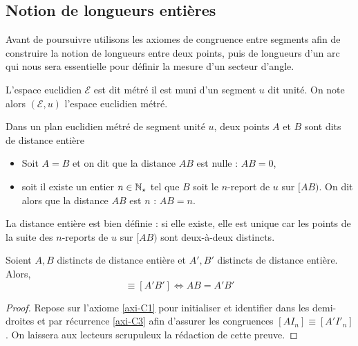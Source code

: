         \subsection{Notion de longueurs entières}

Avant de poursuivre utilisons les axiomes de congruence entre segments afin de construire la notion de longueurs entre deux points, puis de longueurs d'un arc qui nous sera essentielle pour définir la mesure d'un secteur d'angle.

\begin{defi}
    L'espace euclidien $\mathcal{E}$ est dit métré \ssi il est muni d'un segment $u$ dit unité. On note alors $(\mathcal{E},u)$ l'espace euclidien métré. 
\end{defi}
\begin{defi}
    Dans un plan euclidien métré de segment unité $u$, deux points $A$ et $B$ sont dits de distance entière \ssi
    \begin{itemize}[$\bullet$]
        \item Soit $A=B$ et on dit que la distance $AB$ est nulle : $AB=0$,
        \item soit il existe un entier $n\in \mathbb{N}_\star$ tel que $B$ soit le $n$-report de $u$ sur $[AB)$. On dit alors que la distance $AB$ est $n$ : $AB=n$. 
    \end{itemize}
\end{defi}
\begin{rema}
    La distance entière est bien définie : si elle existe, elle est unique car les points de la suite des $n$-reports de $u$ sur $[AB)$ sont deux-à-deux distincts.
\end{rema}
\begin{prop}
    Soient $A,B$ distincts de distance entière et $A',B'$ distincts de distance entière. Alors,
    \begin{equation*}
        [AB]\equiv[A'B'] \Longleftrightarrow AB = A'B'
    \end{equation*}
\begin{proof}
    Repose sur l'axiome \ref{axi-C1} pour initialiser et identifier dans les demi-droites et par récurrence \ref{axi-C3} afin d'assurer les congruences $[AI_n]\equiv[A'I'_n]$. On laissera aux lecteurs scrupuleux la rédaction de cette preuve.
\end{proof}
\end{prop}
